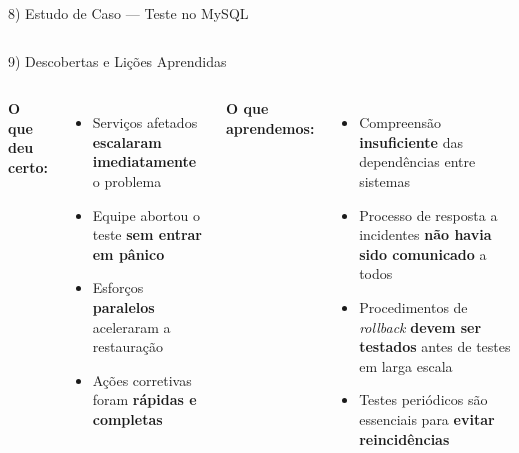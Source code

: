 \documentclass[aspectratio=169]{beamer}
\begin{document}
\begin{frame}{8) Estudo de Caso — Teste no MySQL}
\begin{columns}[T]
  \end{columns}
\end{frame}

\begin{frame}{9) Descobertas e Lições Aprendidas}

  \begin{columns}[T]
    \column{\textwidth}
      \textbf{O que deu certo:}
      \begin{itemize}
        \item Serviços afetados \textbf{escalaram imediatamente} o problema
        \item Equipe abortou o teste \textbf{sem entrar em pânico}
        \item Esforços \textbf{paralelos} aceleraram a restauração
        \item Ações corretivas foram \textbf{rápidas e completas}
      \end{itemize}
      \vspace{0.4em}
      \textbf{O que aprendemos:}
      \begin{itemize}
        \item Compreensão \textbf{insuficiente} das dependências entre sistemas
        \item Processo de resposta a incidentes \textbf{não havia sido comunicado} a todos
        \item Procedimentos de \textit{rollback} \textbf{devem ser testados} antes de testes em larga escala
        \item Testes periódicos são essenciais para \textbf{evitar reincidências}
      \end{itemize}

    
  \end{columns}
\end{frame}
\end{document}
